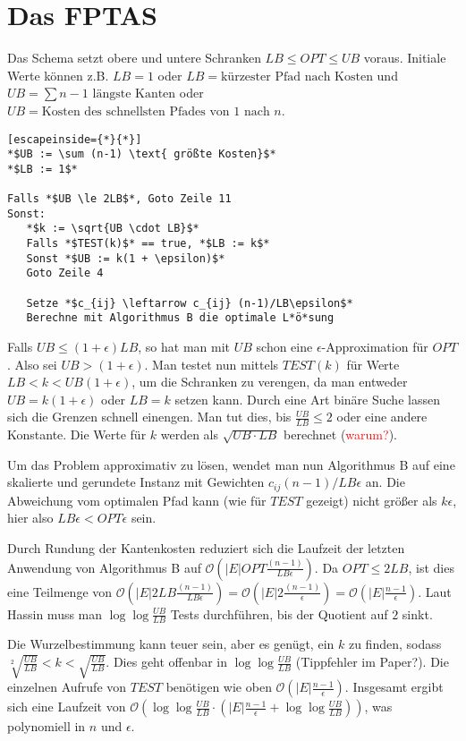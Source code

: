 \documentclass{article}
\begin{document}
\section{Das FPTAS}

Das Schema setzt obere und untere Schranken $LB \le OPT \le UB$ voraus. Initiale
Werte können z.B. $LB=1$ oder $LB=\text{kürzester Pfad nach Kosten}$ und
$UB=\sum n-1 \text{ längste Kanten}$ oder $UB=\text{Kosten des schnellsten
Pfades von $1$ nach $n$}$.

\begin{lstlisting}[escapeinside={*}{*}]
*$UB := \sum (n-1) \text{ größte Kosten}$*
*$LB := 1$*

Falls *$UB \le 2LB$*, Goto Zeile 11
Sonst:
   *$k := \sqrt{UB \cdot LB}$*
   Falls *$TEST(k)$* == true, *$LB := k$*
   Sonst *$UB := k(1 + \epsilon)$*
   Goto Zeile 4

   Setze *$c_{ij} \leftarrow c_{ij} (n-1)/LB\epsilon$*
   Berechne mit Algorithmus B die optimale L*ö*sung
\end{lstlisting}

Falls $UB \le (1+\epsilon)LB$, so hat man mit $UB$ schon eine
$\epsilon$-Approximation für $OPT$. Also sei $UB > (1+\epsilon)$. Man testet nun
mittels $TEST(k)$ für Werte $LB < k < UB(1+\epsilon)$, um die Schranken zu
verengen, da man entweder $UB=k(1+\epsilon)$ oder $LB = k$ setzen kann. Durch
eine Art binäre Suche lassen sich die Grenzen schnell einengen. Man tut dies, bis
$\frac{UB}{LB} \le 2$ oder eine andere Konstante. Die Werte für $k$ werden als
$\sqrt{UB \cdot LB}$ berechnet (\textcolor{red}{warum?}).

Um das Problem approximativ zu lösen, wendet man nun Algorithmus B auf eine skalierte
und gerundete Instanz mit Gewichten $c_{ij}(n-1)/LB\epsilon$ an. Die Abweichung
vom optimalen Pfad kann (wie für $TEST$ gezeigt) nicht größer als $k\epsilon$,
hier also $LB\epsilon < OPT\epsilon$ sein.

Durch Rundung der Kantenkosten reduziert sich die Laufzeit der letzten Anwendung
von Algorithmus B auf $\mathcal{O}\left(|E| OPT\frac{(n-1)}{LB\epsilon}\right)$. Da $OPT
\le 2LB$, ist dies eine Teilmenge von $\mathcal{O}(|E|
2LB\frac{(n-1)}{LB\epsilon})=\mathcal{O}(|E|
2\frac{(n-1)}{\epsilon})=\mathcal{O}\left(|E|\frac{n-1}{\epsilon}\right)$. Laut Hassin muss
man $\log{\log{\frac{UB}{LB}}}$ Tests durchführen, bis der Quotient auf $2$
sinkt.

Die Wurzelbestimmung kann teuer sein, aber es genügt, ein $k$ zu finden, sodass
$\sqrt[2]{\frac{UB}{LB}} < k < \sqrt{\frac{UB}{LB}}$. Dies geht offenbar in
$\log{\log{\frac{UB}{LB}}}$ (Tippfehler im Paper?). Die einzelnen Aufrufe von
$TEST$ benötigen wie oben $\mathcal{O}\left(|E|\frac{n-1}{\epsilon}\right)$. Insgesamt
ergibt sich eine Laufzeit von
$\mathcal{O}(\log\log{\frac{UB}{LB}\cdot(|E|\frac{n-1}{\epsilon} +
\log\log{\frac{UB}{LB}})})$, was polynomiell in $n$ und $\epsilon$.

\end{document}
